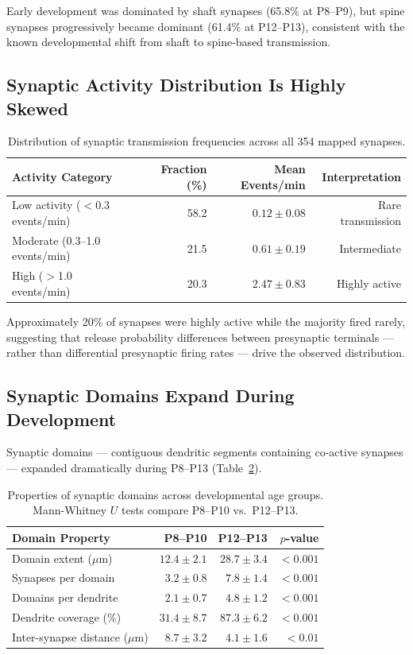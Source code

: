 \documentclass[11pt]{article}
\begin{document}
Early development was dominated by shaft synapses (65.8\% at P8--P9), but spine synapses progressively became dominant (61.4\% at P12--P13), consistent with the known developmental shift from shaft to spine-based transmission.

\subsection{Synaptic Activity Distribution Is Highly Skewed}

\begin{table}[H]
\centering
\caption{Distribution of synaptic transmission frequencies across all 354 mapped synapses.}
\label{tab:activity}
\begin{tabular}{lrrr}
\toprule
\textbf{Activity Category} & \textbf{Fraction (\%)} & \textbf{Mean Events/min} & \textbf{Interpretation} \\
\midrule
Low activity ($<$0.3 events/min) & 58.2 & $0.12 \pm 0.08$ & Rare transmission \\
Moderate (0.3--1.0 events/min) & 21.5 & $0.61 \pm 0.19$ & Intermediate \\
High ($>$1.0 events/min) & 20.3 & $2.47 \pm 0.83$ & Highly active \\
\bottomrule
\end{tabular}
\end{table}

Approximately 20\% of synapses were highly active while the majority fired rarely, suggesting that release probability differences between presynaptic terminals --- rather than differential presynaptic firing rates --- drive the observed distribution.

\subsection{Synaptic Domains Expand During Development}

Synaptic domains --- contiguous dendritic segments containing co-active synapses --- expanded dramatically during P8--P13 (Table~\ref{tab:domains}).

\begin{table}[H]
\centering
\caption{Properties of synaptic domains across developmental age groups. Mann-Whitney $U$ tests compare P8--P10 vs.\ P12--P13.}
\label{tab:domains}
\begin{tabular}{lrrr}
\toprule
\textbf{Domain Property} & \textbf{P8--P10} & \textbf{P12--P13} & \textbf{$p$-value} \\
\midrule
Domain extent ($\mu$m) & $12.4 \pm 2.1$ & $28.7 \pm 3.4$ & $<0.001$ \\
Synapses per domain & $3.2 \pm 0.8$ & $7.8 \pm 1.4$ & $<0.001$ \\
Domains per dendrite & $2.1 \pm 0.7$ & $4.8 \pm 1.2$ & $<0.001$ \\
Dendrite coverage (\%) & $31.4 \pm 8.7$ & $87.3 \pm 6.2$ & $<0.001$ \\
Inter-synapse distance ($\mu$m) & $8.7 \pm 3.2$ & $4.1 \pm 1.6$ & $<0.01$ \\
\bottomrule
\end{tabular}
\end{table}
\end{document}
